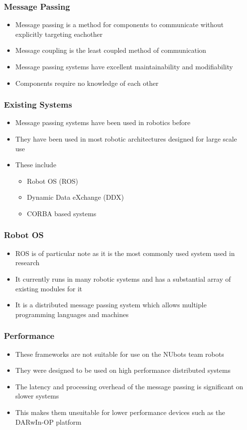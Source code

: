 \documentclass{beamer}
\begin{document}
\begin{frame}
	\frametitle{Message Passing}
	\begin{itemize}
		\item Message passing is a method for components to communicate without explicitly targeting eachother
		\item Message coupling is the least coupled method of communication
		\item Message passing systems have excellent maintainability and modifiability
		\item Components require no knowledge of each other
	\end{itemize}
\end{frame}

\begin{frame}
	\frametitle{Existing Systems}
	\begin{itemize}
		\item Message passing systems have been used in robotics before
		\item They have been used in most robotic architectures designed for large scale use
		\item These include
		\begin{itemize}
			\item Robot OS (ROS)
			\item Dynamic Data eXchange (DDX)
			\item CORBA based systems
		\end{itemize}
	\end{itemize}
\end{frame}

\begin{frame}
	\frametitle{Robot OS}
	\begin{itemize}
		\item ROS is of particular note as it is the most commonly used system used in research
		\item It currently runs in many robotic systems and has a substantial array of existing modules for it
		\item It is a distributed message passing system which allows multiple programming languages and machines
	\end{itemize}
\end{frame}

\begin{frame}
	\frametitle{Performance}
	\begin{itemize}
		\item These frameworks are not suitable for use on the NUbots team robots
		\item They were designed to be used on high performance distributed systems
		\item The latency and processing overhead of the message passing is significant on slower systems
		\item This makes them unsuitable for lower performance devices such as the DARwIn-OP platform
	\end{itemize}
\end{frame}
\end{document}
